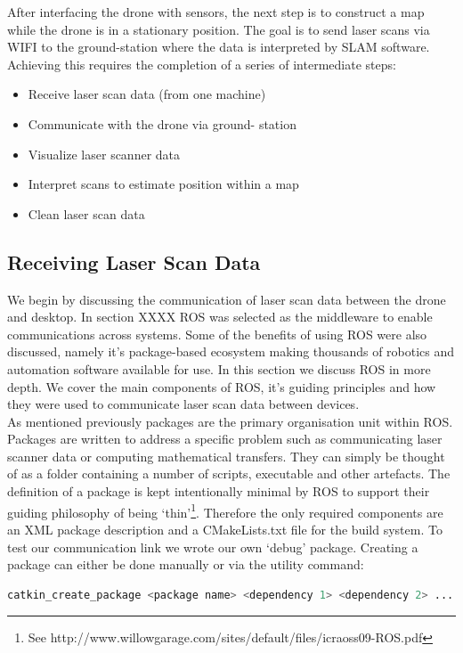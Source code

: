 \documentclass[capstone_report.tex]{subfiles}
\begin{document}
After interfacing the drone with sensors, the next step is to construct a map while the drone is in a stationary position.   The goal is to send laser scans via WIFI to the ground-station where the data is interpreted by SLAM software.  Achieving this requires the completion of a series of intermediate steps:

\begin{itemize}
    \item Receive laser scan data (from one machine)
    \item Communicate with the drone via ground- station
    \item Visualize laser scanner data
    \item Interpret scans to estimate position within a map
    \item Clean laser scan data
\end{itemize}

\subsection{Receiving Laser Scan Data}
We begin by discussing the communication of laser scan data between the drone and desktop.  In section XXXX ROS was selected as the middleware to enable communications across systems.   Some of the benefits of using ROS were also discussed, namely it’s package-based ecosystem making thousands of robotics and automation software available for use.  In this section we discuss ROS in more depth.  We cover the main components of ROS, it’s guiding principles and how they were used to communicate laser scan data between devices.\\

As mentioned previously packages are the primary organisation unit within ROS.  Packages are written to address a specific problem such as communicating laser scanner data or computing mathematical transfers.  They can simply be thought of as a folder containing a number of scripts, executable and other artefacts. The definition of a package is kept intentionally minimal by ROS to support their guiding philosophy of being ‘thin’\footnote{See http://www.willowgarage.com/sites/default/files/icraoss09-ROS.pdf}.  Therefore the only required components are an XML package description and a CMakeLists.txt file for the build system.  To test our communication link we wrote our own ‘debug’ package. Creating a package can either be done manually or via the utility command:

\begin{lstlisting}[language=bash]
    catkin_create_package <package name> <dependency 1> <dependency 2> ... 
\end{lstlisting}
\end{document}
